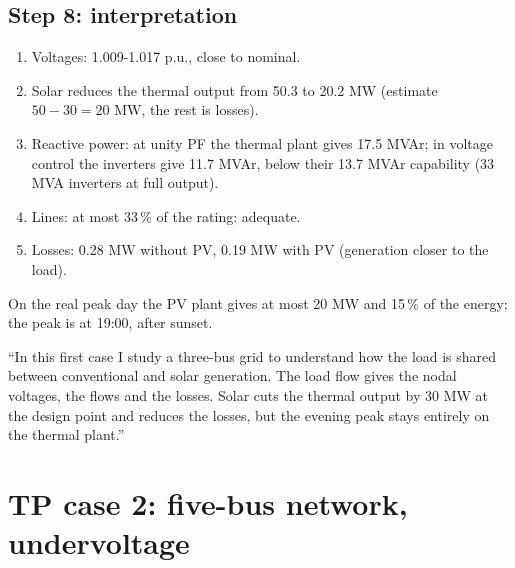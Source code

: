 \documentclass[11pt,a4paper]{article}
\begin{document}
\subsection{Step 8: interpretation}
\begin{enumerate}
\item Voltages: 1.009-1.017 p.u., close to nominal.
\item Solar reduces the thermal output from 50.3 to 20.2 MW (estimate $50 - 30 = 20$ MW, the rest is losses).
\item Reactive power: at unity PF the thermal plant gives 17.5 MVAr; in voltage control the inverters give 11.7 MVAr, below
      their 13.7 MVAr capability (33 MVA inverters at full output).
\item Lines: at most 33\,\% of the rating: adequate.
\item Losses: 0.28 MW without PV, 0.19 MW with PV (generation closer to the load).
\end{enumerate}
On the real peak day the PV plant gives at most 20 MW and 15\,\% of the energy; the peak is at 19:00, after sunset.
\begin{sayit}
``In this first case I study a three-bus grid to understand how the load is shared between conventional and solar
generation. The load flow gives the nodal voltages, the flows and the losses. Solar cuts the thermal output by 30 MW at
the design point and reduces the losses, but the evening peak stays entirely on the thermal plant.''
\end{sayit}

\section{TP case 2: five-bus network, undervoltage}
\end{document}
